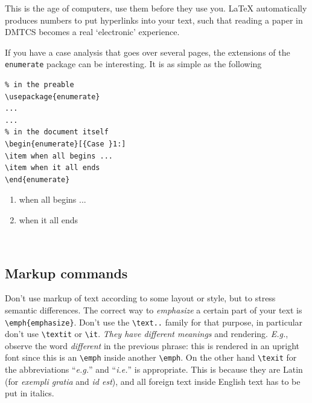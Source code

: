 \documentclass[
submission
]{dmtcs-episciences}
\begin{document}
This is the age of computers, use them before they use you. \LaTeX{}
automatically produces numbers to put hyperlinks into your text, such
that reading a paper in DMTCS becomes a real `electronic' experience.

If you have a case analysis that goes over several pages, the
extensions of the \verb!enumerate! package can be interesting. It is
as simple as the following\\[3ex]

\hfil
\begin{minipage}{0.45\linewidth}
\begin{verbatim}
% in the preable
\usepackage{enumerate}
...
...
% in the document itself
\begin{enumerate}[{Case }1:]
\item when all begins ...
\item when it all ends
\end{enumerate}
\end{verbatim}
\end{minipage}%
\hfil
\begin{minipage}{0.45\linewidth}
\vspace*{12ex}
\begin{enumerate}[{Case }1:]
\item when all begins ...
\item when it all ends
\end{enumerate}
\end{minipage}\\[3ex]




\subsection{Markup commands}
\label{sec:markup}

Don't use markup of text according to some layout or style, but to
stress semantic differences. The correct way to \emph{emphasize} a
certain part of your text is \verb!\emph{emphasize}!. Don't use the
\verb!\text..! family for that purpose, in particular don't use
\verb!\textit! or \verb!\it!. \emph{They have \emph{different}
  meanings} and rendering. \textit{E.g.}, observe the word
\emph{different} in the previous phrase: this is rendered in an
upright font since this is an \verb!\emph! inside another
\verb!\emph!. On the other hand \verb!\texit! for the abbreviations
``\textit{e.g.}'' and ``\textit{i.e.}'' is appropriate. This is
because they are Latin (for \textit{exempli gratia} and \textit{id
  est}), and all foreign text inside English text has to be put in
italics.
\end{document}
